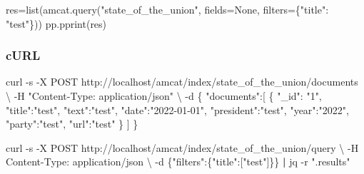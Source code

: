 \documentclass[
  letterpaper,
  DIV=11,
  numbers=noendperiod]{scrreprt}
\newenvironment{Shaded}{\begin{snugshade}}{\end{snugshade}}
\newcommand{\AttributeTok}[1]{\textcolor[rgb]{0.40,0.45,0.13}{#1}}
\newcommand{\BuiltInTok}[1]{\textcolor[rgb]{0.00,0.23,0.31}{#1}}
\newcommand{\DataTypeTok}[1]{\textcolor[rgb]{0.68,0.00,0.00}{#1}}
\newcommand{\ExtensionTok}[1]{\textcolor[rgb]{0.00,0.23,0.31}{#1}}
\newcommand{\KeywordTok}[1]{\textcolor[rgb]{0.00,0.23,0.31}{\textbf{#1}}}
\newcommand{\NormalTok}[1]{\textcolor[rgb]{0.00,0.23,0.31}{#1}}
\newcommand{\OperatorTok}[1]{\textcolor[rgb]{0.37,0.37,0.37}{#1}}
\newcommand{\StringTok}[1]{\textcolor[rgb]{0.13,0.47,0.30}{#1}}
\newcommand{\VariableTok}[1]{\textcolor[rgb]{0.07,0.07,0.07}{#1}}
\begin{document}
\begin{Shaded}
\begin{Highlighting}[]
\NormalTok{res}\OperatorTok{=}\BuiltInTok{list}\NormalTok{(amcat.query(}\StringTok{"state\_of\_the\_union"}\NormalTok{, fields}\OperatorTok{=}\VariableTok{None}\NormalTok{, filters}\OperatorTok{=}\NormalTok{\{}\StringTok{"title"}\NormalTok{: }\StringTok{"test"}\NormalTok{\}))}
\NormalTok{pp.pprint(res)}
\end{Highlighting}
\end{Shaded}

\subsubsection{cURL}

\begin{Shaded}
\begin{Highlighting}[]
\ExtensionTok{curl} \AttributeTok{{-}s} \AttributeTok{{-}X}\NormalTok{ POST http://localhost/amcat/index/state\_of\_the\_union/documents }\DataTypeTok{\textbackslash{}}
  \AttributeTok{{-}H} \StringTok{"Content{-}Type: application/json"} \DataTypeTok{\textbackslash{}}
  \AttributeTok{{-}d} \StringTok{\textquotesingle{}\{}
\StringTok{        "documents":[}
\StringTok{          \{}
\StringTok{            "\_id": "1",}
\StringTok{            "title":"test",}
\StringTok{            "text":"test",}
\StringTok{            "date":"2022{-}01{-}01",}
\StringTok{            "president":"test",}
\StringTok{            "year":"2022",}
\StringTok{            "party":"test",}
\StringTok{            "url":"test"}
\StringTok{          \}}
\StringTok{        ]}
\StringTok{      \}\textquotesingle{}}
\end{Highlighting}
\end{Shaded}

\begin{Shaded}
\begin{Highlighting}[]
\ExtensionTok{curl} \AttributeTok{{-}s} \AttributeTok{{-}X}\NormalTok{ POST http://localhost/amcat/index/state\_of\_the\_union/query }\DataTypeTok{\textbackslash{}}
  \AttributeTok{{-}H} \StringTok{\textquotesingle{}Content{-}Type: application/json\textquotesingle{}} \DataTypeTok{\textbackslash{}}
  \AttributeTok{{-}d} \StringTok{\textquotesingle{}\{"filters":\{"title":["test"]\}\}\textquotesingle{}} \KeywordTok{|} \ExtensionTok{jq} \AttributeTok{{-}r} \StringTok{".results"}
\end{Highlighting}
\end{Shaded}
\end{document}
